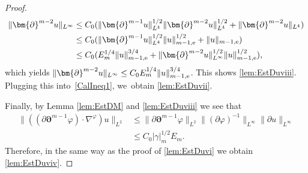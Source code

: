 \begin{proof}
\begin{align*}
\|\bm{\partial}^{m-2} u\|_{L^\infty}
&\leq C_0 (\|\bm{\partial}^{m-1} u\|_{L^4}^{1/2} \|\bm{\partial}^{m-2} u\|_{L^4}^{1/2} + \|\bm{\partial}^{m-2} u\|_{L^4}) \\
&\leq C_0 (\|\bm{\partial}^{m-1} u\|_{L^4}^{1/2} \|u\|_{m-1,{\rm e}}^{1/2} + \|u\|_{m-1,{\rm e}}) \\
&\leq C_0 (E_m^{1/4}\|u\|_{m-1,{\rm e}}^{3/4} + \|\bm{\partial}^{m-2}u\|_{L^\infty}^{1/2}\|u\|_{m-1,{\rm e}}^{1/2}),
\end{align*}
which yields $\|\bm{\partial}^{m-2} u\|_{L^\infty} \leq C_0E_m^{1/4}\|u\|_{m-1,{\rm e}}^{3/4}$.
This shows \eqref{lem:EstDuviii}.
Plugging this into~\eqref{CalIneq1}, we~obtain \eqref{lem:EstDuvii}.

Finally, by Lemma \ref{lem:EstDM} and \eqref{lem:EstDuviii} we see that
\begin{align*}
\|((\partial\bm{\partial}^{m-1}\varphi)\cdot\nabla^\varphi)u\|_{L^2}
&\leq \|\partial\bm{\partial}^{m-1}\varphi\|_{L^2} \|(\partial\varphi)^{-1}\|_{L^\infty} \|\partial u\|_{L^\infty} \\
&\leq C_0|\gamma|_m^{1/2}E_m.
\end{align*}
Therefore, in the same way as the proof of \eqref{lem:EstDuvi} we obtain \eqref{lem:EstDuviv}.
\end{proof}

